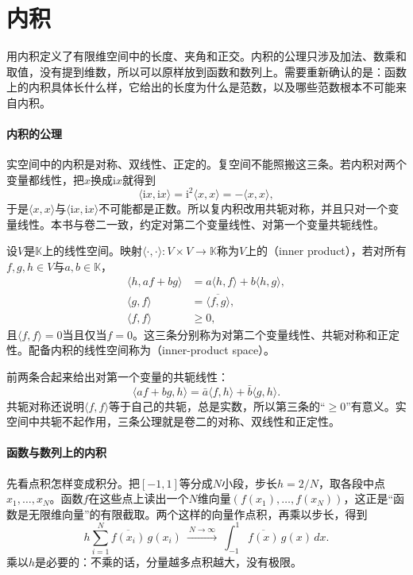\section{内积}
\label{sec:ipspace-inner-products}

用内积定义了有限维空间中的长度、夹角和正交。内积的公理只涉及加法、数乘和取值，没有提到维数，所以可以原样放到函数和数列上。需要重新确认的是：函数上的内积具体长什么样，它给出的长度为什么是范数，以及哪些范数根本不可能来自内积。

\paragraph{内积的公理}
实空间中的内积是对称、双线性、正定的。复空间不能照搬这三条。若内积对两个变量都线性，把$x$换成$\mathrm ix$就得到
\[
 \langle\mathrm ix,\mathrm ix\rangle=\mathrm i^2\langle x,x\rangle=-\langle x,x\rangle,
\]
于是$\langle x,x\rangle$与$\langle\mathrm ix,\mathrm ix\rangle$不可能都是正数。所以复内积改用共轭对称，并且只对一个变量线性。本书与卷二一致，约定对第二个变量线性、对第一个变量共轭线性。

\begin{definition}[内积与内积空间]
\label{def:ipspace-inner-product}
设$V$是$\mathbb K$上的线性空间。映射$\langle\cdot,\cdot\rangle:V\times V\to\mathbb K$称为$V$上的（inner product），若对所有$f,g,h\in V$与$a,b\in\mathbb K$，
\begin{align}
 \langle h,af+bg\rangle&=a\langle h,f\rangle+b\langle h,g\rangle,
 \label{eq:ipspace-axiom-linear}\\
 \langle g,f\rangle&=\overline{\langle f,g\rangle},
 \label{eq:ipspace-axiom-conjugate}\\
 \langle f,f\rangle&\geq0,
 \label{eq:ipspace-axiom-positive}
\end{align}
且$\langle f,f\rangle=0$当且仅当$f=0$。这三条分别称为对第二个变量线性、共轭对称和正定性。配备内积的线性空间称为（inner-product space）。
\end{definition}

前两条合起来给出对第一个变量的共轭线性：
\[
 \langle af+bg,h\rangle=\bar a\langle f,h\rangle+\bar b\langle g,h\rangle.
\]
共轭对称还说明$\langle f,f\rangle$等于自己的共轭，总是实数，所以第三条的“$\geq0$”有意义。实空间中共轭不起作用，三条公理就是卷二的对称、双线性和正定性。

\paragraph{函数与数列上的内积}
先看点积怎样变成积分。把$[-1,1]$等分成$N$小段，步长$h=2/N$，取各段中点$x_1,\ldots,x_N$。函数$f$在这些点上读出一个$N$维向量$(f(x_1),\ldots,f(x_N))$，这正是“函数是无限维向量”的有限截取。两个这样的向量作点积，再乘以步长，得到
\begin{equation}
 h\sum_{i=1}^N\overline{f(x_i)}\,g(x_i)\ \xrightarrow{\ N\to\infty\ }\ \int_{-1}^1\overline{f(x)}\,g(x)\,dx .
 \label{eq:ipspace-riemann-dot}
\end{equation}
乘以$h$是必要的：不乘的话，分量越多点积越大，没有极限。

